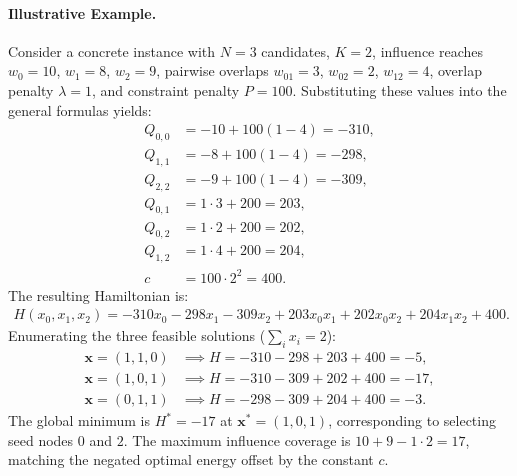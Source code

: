 \documentclass[12pt]{article}
\begin{document}
\paragraph{Illustrative Example.}
Consider a concrete instance with $N=3$ candidates, $K=2$, influence reaches $w_0=10$, $w_1=8$, $w_2=9$, pairwise overlaps $w_{01}=3$, $w_{02}=2$, $w_{12}=4$, overlap penalty $\lambda=1$, and constraint penalty $P=100$. Substituting these values into the general formulas yields:
\begin{align}
Q_{0,0} &= -10 + 100(1 - 4) = -310, \\
Q_{1,1} &= -8 + 100(1 - 4) = -298, \\
Q_{2,2} &= -9 + 100(1 - 4) = -309, \\
Q_{0,1} &= 1 \cdot 3 + 200 = 203, \\
Q_{0,2} &= 1 \cdot 2 + 200 = 202, \\
Q_{1,2} &= 1 \cdot 4 + 200 = 204, \\
c &= 100 \cdot 2^2 = 400.
\end{align}
The resulting Hamiltonian is:
\begin{align}
H(x_0,x_1,x_2) = -310x_0 - 298x_1 - 309x_2 + 203x_0x_1 + 202x_0x_2 + 204x_1x_2 + 400.
\end{align}
Enumerating the three feasible solutions ($\sum_i x_i = 2$):
\begin{align}
\mathbf{x} = (1,1,0) &\implies H = -310 - 298 + 203 + 400 = -5, \\
\mathbf{x} = (1,0,1) &\implies H = -310 - 309 + 202 + 400 = -17, \\
\mathbf{x} = (0,1,1) &\implies H = -298 - 309 + 204 + 400 = -3.
\end{align}
The global minimum is $H^* = -17$ at $\mathbf{x}^* = (1,0,1)$, corresponding to selecting seed nodes $0$ and $2$. The maximum influence coverage is $10 + 9 - 1 \cdot 2 = 17$, matching the negated optimal energy offset by the constant $c$.
\end{document}
